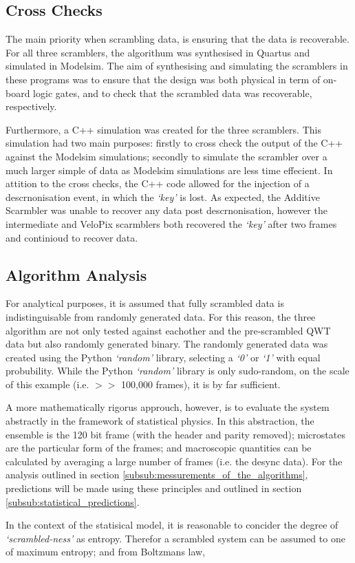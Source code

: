 	\subsection{Cross Checks} %
	\label{sub:cross_checks}
		The main priority when scrambling data, is ensuring that the data is recoverable.
		For all three scramblers, the algorithum was synthesised in Quartus\supercite{ref:quartus} and simulated in Modelsim\supercite{ref:modelsim}.
		The aim of synthesising and simulating the scramblers in these programs was to ensure that the design was both physical in term of on-board logic gates, and to check that the scrambled data was recoverable, respectively.
		\par
		Furthermore, a C++ simulation was created for the three scramblers.
		This simulation had two main purposes:
		firstly to cross check the output of the C++ against the Modelsim simulations;
		secondly to simulate the scrambler over a much larger simple of data as Modelsim simulations are less time effecient.
		In attition to the cross checks, the C++ code allowed for the injection of a descrnonisation event, in which the \textit{`key'} is lost.
		As expected, the Additive Scarmbler was unable to recover any data post descrnonisation, however the intermediate and VeloPix scarmblers both recovered the \textit{`key'} after two frames and continioud to recover data.


	\subsection{Algorithm Analysis}
	\label{sub:algorithm_analysis}

		For analytical purposes, it is assumed that fully scrambled data is indistinguisable from randomly generated data. 
		For this reason, the three algorithm are not only tested against eachother and the pre-scrambled QWT data but also randomly generated binary.
		The randomly generated data was created using the Python \textit{`random'} library, selecting a \textit{`0'} or \textit{`1'} with equal probubility.
		While the Python \textit{`random'} library is only sudo-random, on the scale of this example (i.e. $>>$ 100,000 frames), it is by far sufficient.
		\par
		A more mathematically rigorus approuch, however, is to evaluate the system abstractly in the framework of statistical physics.
		In this abstraction, the ensemble is the 120 bit frame (with the header and parity removed); 
		microstates are the particular form of the frames;
		and macroscopic quantities can be calculated by averaging a large number of frames (i.e. the desync data).
		For the analysis outlined in section \ref{subsub:messurements_of_the_algorithms}, predictions will be made using these principles and outlined in section \ref{subsub:statistical_predictions}.
		\par
		In the context of the statisical model, it is reasonable to concider the degree of \textit{`scrambled-ness'} as entropy.
		Therefor a scrambled system can be assumed to one of maximum entropy; and from Boltzmans law,

